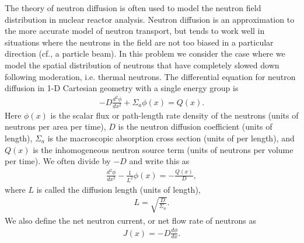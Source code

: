 The theory of neutron diffusion is often used to model the neutron field distribution in nuclear reactor analysis. Neutron diffusion is an approximation to the more accurate model of neutron transport, but tends to work well in situations where the neutrons in the field are not too biased in a particular direction (cf., a particle beam). In this problem we consider the case where we model the spatial distribution of neutrons that have completely slowed down following moderation, i.e. thermal neutrons. The differential equation for neutron diffusion in 1-D Cartesian geometry with a single energy group is
\begin{align}
  -D \frac{d^2 \phi}{dx^2} + \Sigma_a \phi(x) = Q(x).
\end{align}
Here $\phi(x)$ is the scalar flux or path-length rate density of the neutrons (units of neutrons per area per time), $D$ is the neutron diffusion coefficient (units of length), $\Sigma_a$ is the macroscopic absorption cross section (units of per length), and $Q(x)$ is the inhomogeneous neutron source term (units of neutrons per volume per time). We often divide by $-D$ and write this as
\begin{align}
  \frac{d^2 \phi}{dx^2} - \frac{1}{L^2} \phi(x) = -\frac{Q(x)}{D},
\end{align}
where $L$ is called the diffusion length (units of length),
\begin{align}
  L = \sqrt{ \frac{D}{\Sigma_a} }.
\end{align}
We also define the net neutron current, or net flow rate of neutrons as
\begin{align}
  J(x) = -D \frac{d\phi}{dx}.
\end{align}

